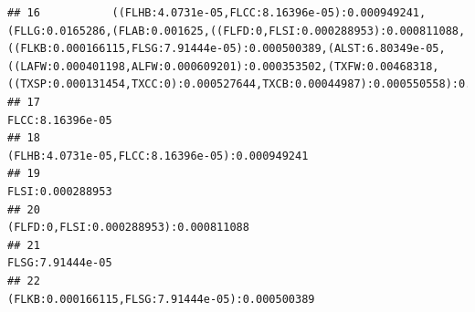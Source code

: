 \documentclass[]{article}
\begin{document}
\begin{verbatim}
## 16           ((FLHB:4.0731e-05,FLCC:8.16396e-05):0.000949241,(FLLG:0.0165286,(FLAB:0.001625,((FLFD:0,FLSI:0.000288953):0.000811088,((FLKB:0.000166115,FLSG:7.91444e-05):0.000500389,(ALST:6.80349e-05,((LAFW:0.000401198,ALFW:0.000609201):0.000353502,(TXFW:0.00468318,((TXSP:0.000131454,TXCC:0):0.000527644,TXCB:0.00044987):0.000550558):0.00263375):0.000535248):0.0026018):0.000242145):0.00153256):0.00951218):0.00146329):0
## 17                                                                                                                                                                                                                                                                                                                                                                                                                 FLCC:8.16396e-05
## 18                                                                                                                                                                                                                                                                                                                                                                                   (FLHB:4.0731e-05,FLCC:8.16396e-05):0.000949241
## 19                                                                                                                                                                                                                                                                                                                                                                                                                 FLSI:0.000288953
## 20                                                                                                                                                                                                                                                                                                                                                                                            (FLFD:0,FLSI:0.000288953):0.000811088
## 21                                                                                                                                                                                                                                                                                                                                                                                                                 FLSG:7.91444e-05
## 22                                                                                                                                                                                                                                                                                                                                                                                  (FLKB:0.000166115,FLSG:7.91444e-05):0.000500389

\end{verbatim}
\end{document}
